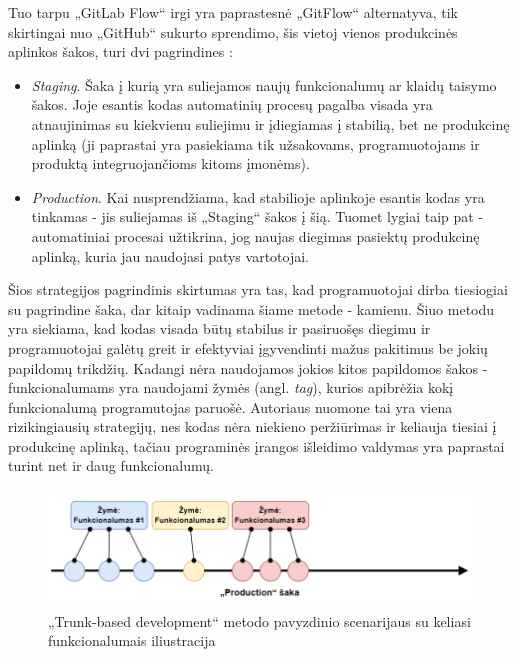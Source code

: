 \documentclass{VUMIFPSkursinis}
\begin{document}
Tuo tarpu „GitLab Flow“ irgi yra paprastesnė „GitFlow“ alternatyva, tik skirtingai nuo „GitHub“ sukurto sprendimo, šis vietoj vienos produkcinės aplinkos šakos, turi dvi pagrindines \cite{SaltDesimtas}:

\begin{itemize}
  \item \textit{Staging}. Šaka į kurią yra suliejamos naujų funkcionalumų ar klaidų taisymo šakos. Joje esantis kodas automatinių procesų pagalba visada yra atnaujinimas su kiekvienu suliejimu ir įdiegiamas į stabilią, bet ne produkcinę aplinką (ji paprastai yra pasiekiama tik užsakovams, programuotojams ir produktą integruojančioms kitoms įmonėms).
  
  \item \textit{Production}. Kai nusprendžiama, kad stabilioje aplinkoje esantis kodas yra tinkamas - jis suliejamas iš „Staging“ šakos į šią. Tuomet lygiai taip pat - automatiniai procesai užtikrina, jog naujas diegimas pasiektų produkcinę aplinką, kuria jau naudojasi patys vartotojai.

\end{itemize}



Šios strategijos pagrindinis skirtumas yra tas, kad programuotojai dirba tiesiogiai su pagrindine šaka, dar kitaip vadinama šiame metode - kamienu. Šiuo metodu yra siekiama, kad kodas visada būtų stabilus ir pasiruošęs diegimu ir programuotojai galėtų greit ir efektyviai įgyvendinti mažus pakitimus be jokių papildomų trikdžių. Kadangi nėra naudojamos jokios kitos papildomos šakos - funkcionalumams yra naudojami žymės (angl. \textit{tag}), kurios apibrėžia kokį funkcionalumą programutojas paruošė. Autoriaus nuomone tai yra viena rizikingiausių strategijų, nes kodas nėra niekieno peržiūrimas ir keliauja tiesiai į produkcinę aplinką, tačiau programinės įrangos išleidimo valdymas yra paprastai turint net ir daug funkcionalumų.

\begin{figure}[H]
    \centering
    \includegraphics[scale=0.6]{img/TrunkBased.png}
    \caption{„Trunk-based development“ metodo pavyzdinio scenarijaus su keliasi funkcionalumais iliustracija}
    \label{img:mlp}
\end{figure}
\end{document}
